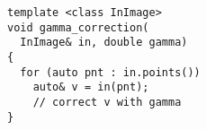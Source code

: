\documentclass[varwidth=4.5cm,border={0.1cm 0.1cm 0.1cm 0.1cm}]{standalone}
\begin{document}
\begin{verbatim}
template <class InImage>
void gamma_correction(
  InImage& in, double gamma)
{
  for (auto pnt : in.points())
    auto& v = in(pnt);
    // correct v with gamma
}
\end{verbatim}
\end{document}
